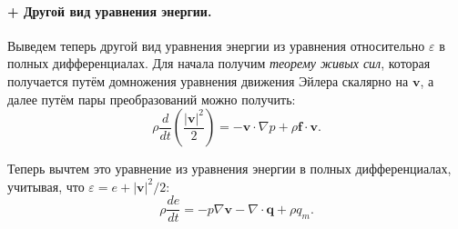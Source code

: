 \paragraph{+ Другой вид уравнения энергии.}
Выведем теперь другой вид уравнения энергии из уравнения относительно $\varepsilon$ в полных
дифференциалах. Для начала получим \emph{теорему живых сил}, которая получается путём домножения
уравнения движения Эйлера скалярно на $\mathbf{v}$, а далее путём пары преобразований можно
получить:
\[
  \rho \dfrac{d}{dt} \left( \dfrac{|\mathbf{v}|^2}{2} \right) = - \mathbf{v} \cdot \nabla p + \rho \mathbf{f} \cdot \mathbf{v}.
\]

Теперь вычтем это уравнение из уравнения энергии в полных дифференциалах, учитывая, что $\varepsilon = e + |\mathbf{v}|^2/2$:
\begin{equation}\label{eq:fluid_energy_2}
  \rho \dfrac{de}{dt} = - p \nabla \mathbf{v} - \nabla \cdot \mathbf{q} + \rho q_m.
\end{equation}
